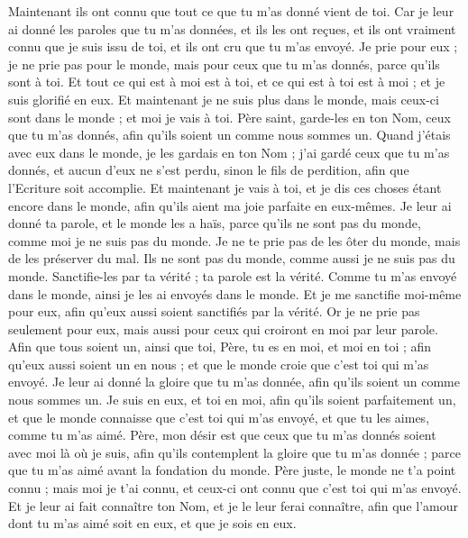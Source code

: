 \begin{multicols}{2}
Maintenant ils ont connu que tout ce que tu m'as donné vient de toi.
Car je leur ai donné les paroles que tu m'as données, et ils les ont reçues, et ils ont vraiment connu que je suis issu de toi, et ils ont cru que tu m'as envoyé.
Je prie pour eux ; je ne prie pas pour le monde, mais pour ceux que tu m'as donnés, parce qu'ils sont à toi.
Et tout ce qui est à moi est à toi, et ce qui est à toi est à moi ; et je suis glorifié en eux.
Et maintenant je ne suis plus dans le monde, mais ceux-ci sont dans le monde ; et moi je vais à toi. Père saint, garde-les en ton Nom, ceux que tu m'as donnés, afin qu'ils soient un comme nous sommes un.
Quand j'étais avec eux dans le monde, je les gardais en ton Nom ; j'ai gardé ceux que tu m'as donnés, et aucun d'eux ne s'est perdu, sinon le fils de perdition, afin que l'Ecriture soit accomplie.
Et maintenant je vais à toi, et je dis ces choses étant encore dans le monde, afin qu'ils aient ma joie parfaite en eux-mêmes.
Je leur ai donné ta parole, et le monde les a haïs, parce qu'ils ne sont pas du monde, comme moi je ne suis pas du monde.
Je ne te prie pas de les ôter du monde, mais de les préserver du mal.
Ils ne sont pas du monde, comme aussi je ne suis pas du monde.
Sanctifie-les par ta vérité ; ta parole est la vérité.
Comme tu m'as envoyé dans le monde, ainsi je les ai envoyés dans le monde.
Et je me sanctifie moi-même pour eux, afin qu'eux aussi soient sanctifiés par la vérité.
Or je ne prie pas seulement pour eux, mais aussi pour ceux qui croiront en moi par leur parole.
Afin que tous soient un, ainsi que toi, Père, tu es en moi, et moi en toi ; afin qu'eux aussi soient un en nous ; et que le monde croie que c'est toi qui m'as envoyé.
Je leur ai donné la gloire que tu m'as donnée, afin qu'ils soient un comme nous sommes un.
Je suis en eux, et toi en moi, afin qu'ils soient parfaitement un, et que le monde connaisse que c'est toi qui m'as envoyé, et que tu les aimes, comme tu m'as aimé.
Père, mon désir est que ceux que tu m'as donnés soient avec moi là où je suis, afin qu'ils contemplent la gloire que tu m'as donnée ; parce que tu m'as aimé avant la fondation du monde.
Père juste, le monde ne t'a point connu ; mais moi je t'ai connu, et ceux-ci ont connu que c'est toi qui m'as envoyé.
Et je leur ai fait connaître ton Nom, et je le leur ferai connaître, afin que l'amour dont tu m'as aimé soit en eux, et que je sois en eux.

\end{multicols}
